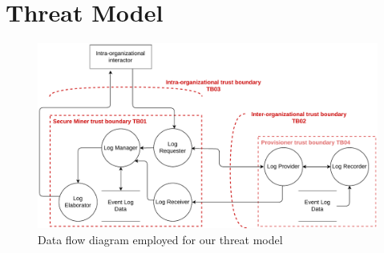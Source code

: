 \section{Threat Model}
\begin{figure}
    \centering
    \includegraphics[width=0.95\linewidth]{content//figures/threatmodel.pdf}
    \caption{Data flow diagram employed for our threat model}
    \label{fig:threatmodel:dataflow}
\end{figure}
